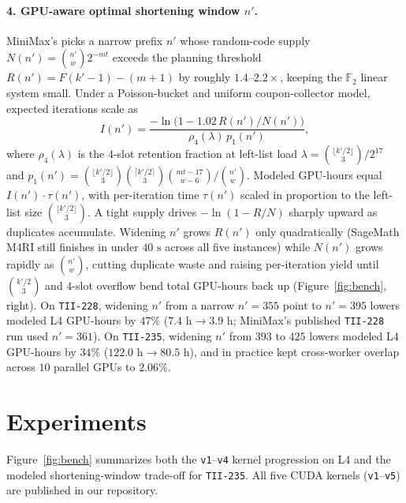 \documentclass[11pt,a4paper]{article}
\begin{document}
\paragraph{4. GPU-aware optimal shortening window $n'$.}
MiniMax's  picks a narrow prefix $n'$ whose random-code supply $N(n') = \binom{n'}{w}2^{-mt}$ exceeds the planning threshold $R(n') = F(k'-1)-(m+1)$ by roughly $1.4\text{--}2.2\times$, keeping the $\mathbb{F}_2$ linear system small. Under a Poisson-bucket and uniform coupon-collector model, expected iterations scale as
\[
  I(n') = \frac{-\ln\!\bigl(1 - 1.02\,R(n') / N(n')\bigr)}{\rho_4(\lambda)\,p_1(n')},
\]
where $\rho_4(\lambda)$ is the $4$-slot retention fraction at left-list load $\lambda = \binom{\lfloor k'/2\rfloor}{3}/2^{17}$ and $p_1(n') = \binom{\lfloor k'/2\rfloor}{3}\binom{\lceil k'/2\rceil}{3}\binom{mt-17}{w-6}/\binom{n'}{w}$. Modeled GPU-hours equal $I(n') \cdot \tau(n')$, with per-iteration time $\tau(n')$ scaled in proportion to the left-list size $\binom{\lfloor k'/2\rfloor}{3}$. A tight supply drives $-\ln(1 - R/N)$ sharply upward as duplicates accumulate. Widening $n'$ grows $R(n')$ only quadratically (SageMath M4RI still finishes in under $40\text{ s}$ across all five instances) while $N(n')$ grows rapidly as $\binom{n'}{w}$, cutting duplicate waste and raising per-iteration yield until $\binom{k'/2}{3}$ and $4$-slot overflow bend total GPU-hours back up (Figure~\ref{fig:bench}, right). On \texttt{TII-228}, widening $n'$ from a narrow $n'=355$ point to $n'=395$ lowers modeled L4 GPU-hours by $47\%$ ($7.4\text{ h} \to 3.9\text{ h}$; MiniMax's published \texttt{TII-228} run used $n'=361$). On \texttt{TII-235}, widening $n'$ from $393$ to $425$ lowers modeled L4 GPU-hours by $34\%$ ($122.0\text{ h} \to 80.5\text{ h}$), and in practice kept cross-worker overlap across $10$ parallel GPUs to $2.06\%$.

\section{Experiments}

Figure~\ref{fig:bench} summarizes both the \texttt{v1}--\texttt{v4} kernel progression on L4 and the modeled shortening-window trade-off for \texttt{TII-235}. All five CUDA kernels (\texttt{v1}--\texttt{v5}) are published in our repository.
\end{document}
